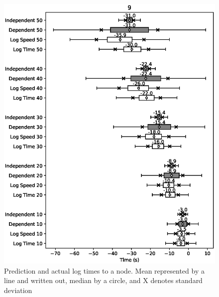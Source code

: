 \documentclass{article}
\begin{document}
				\begin{figure}[H]
					\includegraphics[scale=0.7]{9.eps}
					\caption{Prediction and actual log times to a node. Mean represented by a line and written out, median by a circle, and X denotes standard deviation}
					\label{fig:box2}
				\end{figure}
\end{document}
